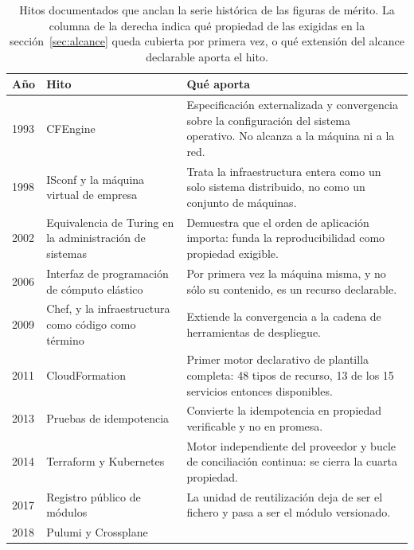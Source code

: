 \documentclass[11pt,letterpaper]{article}
\begin{document}
\begin{table}[htbp]
  \centering
  \footnotesize
  \setlength{\tabcolsep}{4pt}
  \caption{Hitos documentados que anclan la serie histórica de las figuras de
  mérito. La columna de la derecha indica qué propiedad de las exigidas en la
  sección~\ref{sec:alcance} queda cubierta por primera vez, o qué extensión
  del alcance declarable aporta el hito.}
  \label{tab:hitos}
  \begin{tabularx}{\textwidth}{@{}l>{\raggedright\arraybackslash}p{}
    >{\raggedright\arraybackslash}X@{}}
    \toprule
    \textbf{Año} & \textbf{Hito} & \textbf{Qué aporta} \\
    \midrule
    1993 & CFEngine \parencite{burgess1995} & Especificación externalizada y
      convergencia sobre la configuración del sistema operativo. No alcanza a
      la máquina ni a la red. \\
    1998 & ISconf y la máquina virtual de empresa
      \parencite{traugott1998} & Trata la infraestructura entera como un solo
      sistema distribuido, no como un conjunto de máquinas. \\
    2002 & Equivalencia de Turing en la administración de sistemas
      \parencite{traugott2002} & Demuestra que el orden de aplicación importa:
      funda la reproducibilidad como propiedad exigible. \\
    2006 & Interfaz de programación de cómputo elástico & Por primera vez la
      máquina misma, y no sólo su contenido, es un recurso declarable. \\
    2009 & Chef, y la infraestructura como código como término & Extiende la
      convergencia a la cadena de herramientas de despliegue. \\
    2011 & CloudFormation \parencite{cloudformationlaunch} & Primer motor
      declarativo de plantilla completa: 48 tipos de recurso, 13 de los 15
      servicios entonces disponibles. \\
    2013 & Pruebas de idempotencia \parencite{hummer2013} & Convierte la
      idempotencia en propiedad verificable y no en promesa. \\
    2014 & Terraform y Kubernetes \parencite{terraformdocs,burns2016} &
      Motor independiente del proveedor y bucle de conciliación continua: se
      cierra la cuarta propiedad. \\
    2017 & Registro público de módulos & La unidad de reutilización deja de ser
      el fichero y pasa a ser el módulo versionado. \\
    2018 & Pulumi \parencite{pulumilaunch} y Crossplane

\end{tabularx}
\end{table}
\end{document}
